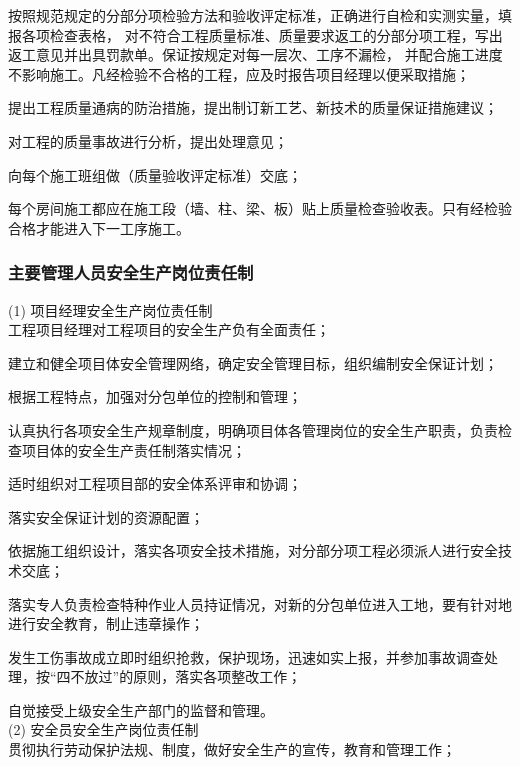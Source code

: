  按照规范规定的分部分项检验方法和验收评定标准，正确进行自检和实测实量，填报各项检查表格，
对不符合工程质量标准、质量要求返工的分部分项工程，写出返工意见并出具罚款单。保证按规定对每一层次、工序不漏检，
并配合施工进度不影响施工。凡经检验不合格的工程，应及时报告项目经理以便采取措施；

 提出工程质量通病的防治措施，提出制订新工艺、新技术的质量保证措施建议；

 对工程的质量事故进行分析，提出处理意见；

 向每个施工班组做（质量验收评定标准）交底；

 每个房间施工都应在施工段（墙、柱、梁、板）贴上质量检查验收表。只有经检验合格才能进入下一工序施工。 \\

\subsubsection{主要管理人员安全生产岗位责任制}

(1) 项目经理安全生产岗位责任制\\

 工程项目经理对工程项目的安全生产负有全面责任；

 建立和健全项目体安全管理网络，确定安全管理目标，组织编制安全保证计划；

 根据工程特点，加强对分包单位的控制和管理；

 认真执行各项安全生产规章制度，明确项目体各管理岗位的安全生产职责，负责检查项目体的安全生产责任制落实情况；

 适时组织对工程项目部的安全体系评审和协调；

 落实安全保证计划的资源配置；

 依据施工组织设计，落实各项安全技术措施，对分部分项工程必须派人进行安全技术交底；

 落实专人负责检查特种作业人员持证情况，对新的分包单位进入工地，要有针对地进行安全教育，制止违章操作；

 发生工伤事故成立即时组织抢救，保护现场，迅速如实上报，并参加事故调查处理，按“四不放过”的原则，落实各项整改工作；

 自觉接受上级安全生产部门的监督和管理。\\

(2) 安全员安全生产岗位责任制\\

 贯彻执行劳动保护法规、制度，做好安全生产的宣传，教育和管理工作；

